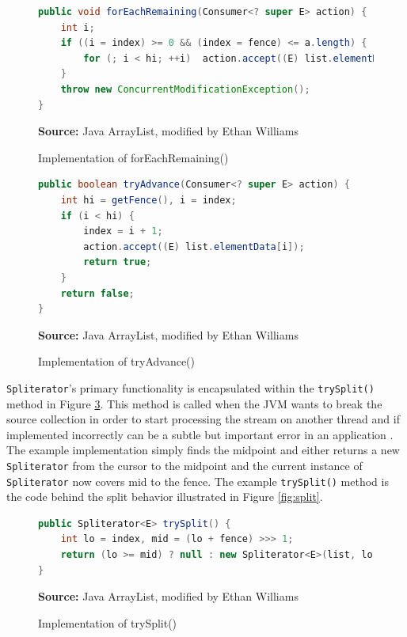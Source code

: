 \documentclass[oneside, 12pt]{article}
\newcommand{\source}[1]{\textbf{Source:} {#1} }
\begin{document}
\begin{figure}[H]
\centering
\begin{lstlisting}[language=Java]
public void forEachRemaining(Consumer<? super E> action) {
    int i;
    if ((i = index) >= 0 && (index = fence) <= a.length) {
        for (; i < hi; ++i)  action.accept((E) list.elementData[i]);
    }
    throw new ConcurrentModificationException();
}
\end{lstlisting}
\caption{Implementation of forEachRemaining()}
\source{Java ArrayList, modified by Ethan Williams}
\label{fig:forEachRemaining}
\end{figure}

\begin{figure}[H]
\centering
\begin{lstlisting}[language=Java]
public boolean tryAdvance(Consumer<? super E> action) {
    int hi = getFence(), i = index;
    if (i < hi) {
        index = i + 1;
        action.accept((E) list.elementData[i]);
        return true;
    }
    return false;
}
\end{lstlisting}
\caption{Implementation of tryAdvance()}
\source{Java ArrayList, modified by Ethan Williams}
\label{fig:tryAdvance}
\end{figure}

\verb|Spliterator|'s primary functionality is encapsulated within the \verb|trySplit()| method in Figure \ref{fig:trySplit}. This method is called when the JVM wants to break the source collection in order to start processing the stream on another thread and if implemented incorrectly can be a subtle but important error in an application \autocite{}. The example implementation simply finds the midpoint and either returns a new \verb|Spliterator| from the cursor to the midpoint and the current instance of \verb|Spliterator| now covers mid to the fence. The example \verb|trySplit()| method is the code behind the split behavior illustrated in Figure \ref{fig:split}.

\begin{figure}[H]
\centering
\begin{lstlisting}[language=Java]
public Spliterator<E> trySplit() {
    int lo = index, mid = (lo + fence) >>> 1;
    return (lo >= mid) ? null : new Spliterator<E>(list, lo, index = mid);
}
\end{lstlisting}
\caption{Implementation of trySplit()}
\source{Java ArrayList, modified by Ethan Williams}
\label{fig:trySplit}
\end{figure}
\end{document}
